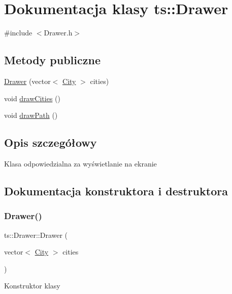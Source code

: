 \hypertarget{classts_1_1_drawer}{}\section{Dokumentacja klasy ts\+:\+:Drawer}
\label{classts_1_1_drawer}


{\ttfamily \#include $<$Drawer.\+h$>$}

\subsection*{Metody publiczne}
\begin{DoxyCompactItemize}
\item 
\mbox{\hyperlink{classts_1_1_drawer_abe6a9094f9cf324006e30a7355adb15e}{Drawer}} (vector$<$ \mbox{\hyperlink{classts_1_1_city}{City}} $>$ cities)
\item 
void \mbox{\hyperlink{classts_1_1_drawer_a746a12f5e8693ea4aca8db7b91e89b32}{draw\+Cities}} ()
\item 
void \mbox{\hyperlink{classts_1_1_drawer_a5df30e090e866aca17986fbd5e518fc3}{draw\+Path}} ()
\end{DoxyCompactItemize}


\subsection{Opis szczegółowy}
Klasa odpowiedzialna za wyświetlanie na ekranie 

\subsection{Dokumentacja konstruktora i destruktora}
\mbox{\label{classts_1_1_drawer_abe6a9094f9cf324006e30a7355adb15e}} 
\subsubsection{\texorpdfstring{Drawer()}{Drawer()}}
{\footnotesize\ttfamily ts\+::\+Drawer\+::\+Drawer (\begin{DoxyParamCaption}\item[{vector$<$ \mbox{\hyperlink{classts_1_1_city}{City}} $>$}]{cities }\end{DoxyParamCaption})}

Konstruktor klasy


